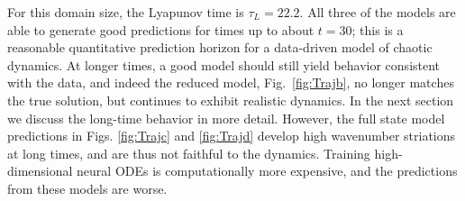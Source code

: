 \documentclass[preprint,aps,pre,letterpaper,onecolumn,superscriptaddress]{revtex4-2} %
\begin{document}
For this domain size, the Lyapunov time is $\tau_L=22.2$. All three of the models are able to generate good predictions for times up to about $t=30$; this is a reasonable quantitative prediction horizon for a data-driven model of chaotic dynamics. At longer times, a good model should still yield behavior consistent with the data, and indeed the reduced model, Fig.\ \ref{fig:Trajb}, no longer matches the true solution, but continues to exhibit realistic dynamics. In the next section we discuss the long-time behavior in more detail. However, the full state model predictions in Figs. \ref{fig:Trajc} and \ref{fig:Trajd} develop high wavenumber striations at long times, and are thus not faithful to the dynamics. Training high-dimensional neural ODEs is computationally more expensive, and the predictions from these models are worse.

\end{document}
